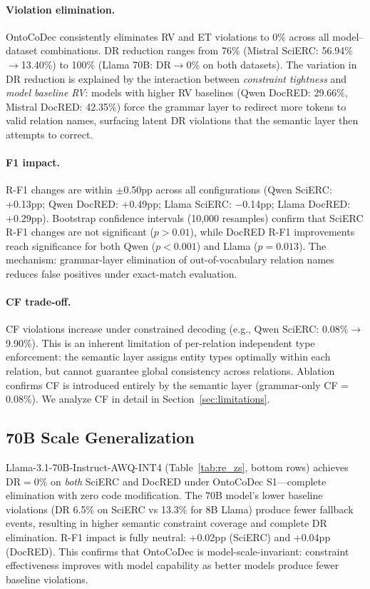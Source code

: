 \documentclass[11pt]{article}
\newcommand{\sys}{OntoCoDec}
\begin{document}
\paragraph{Violation elimination.}
\sys{} consistently eliminates RV and ET violations to 0\% across all model--dataset combinations.
DR reduction ranges from 76\% (Mistral SciERC: 56.94\%$\to$13.40\%) to 100\% (Llama 70B: DR$\to$0\% on both datasets).
The variation in DR reduction is explained by the interaction between \emph{constraint tightness} and \emph{model baseline RV}: models with higher RV baselines (Qwen DocRED: 29.66\%, Mistral DocRED: 42.35\%) force the grammar layer to redirect more tokens to valid relation names, surfacing latent DR violations that the semantic layer then attempts to correct.

\paragraph{F1 impact.}
R-F1 changes are within $\pm$0.50pp across all configurations (Qwen SciERC: +0.13pp; Qwen DocRED: +0.49pp; Llama SciERC: $-$0.14pp; Llama DocRED: +0.29pp).
Bootstrap confidence intervals (10,000 resamples) confirm that SciERC R-F1 changes are not significant ($p>0.01$), while DocRED R-F1 improvements reach significance for both Qwen ($p<0.001$) and Llama ($p=0.013$).
The mechanism: grammar-layer elimination of out-of-vocabulary relation names reduces false positives under exact-match evaluation.

\paragraph{CF trade-off.}
CF violations increase under constrained decoding (e.g., Qwen SciERC: 0.08\%$\to$9.90\%).
This is an inherent limitation of per-relation independent type enforcement: the semantic layer assigns entity types optimally within each relation, but cannot guarantee global consistency across relations.
Ablation confirms CF is introduced entirely by the semantic layer (grammar-only CF = 0.08\%).
We analyze CF in detail in Section~\ref{sec:limitations}.

\subsection{70B Scale Generalization}
\label{sec:scale}

Llama-3.1-70B-Instruct-AWQ-INT4 (Table~\ref{tab:re_zs}, bottom rows) achieves DR$=$0\% on \emph{both} SciERC and DocRED under \sys{} S1---complete elimination with zero code modification.
The 70B model's lower baseline violations (DR 6.5\% on SciERC vs 13.3\% for 8B Llama) produce fewer fallback events, resulting in higher semantic constraint coverage and complete DR elimination.
R-F1 impact is fully neutral: +0.02pp (SciERC) and +0.04pp (DocRED).
This confirms that \sys{} is model-scale-invariant: constraint effectiveness improves with model capability as better models produce fewer baseline violations.
\end{document}
